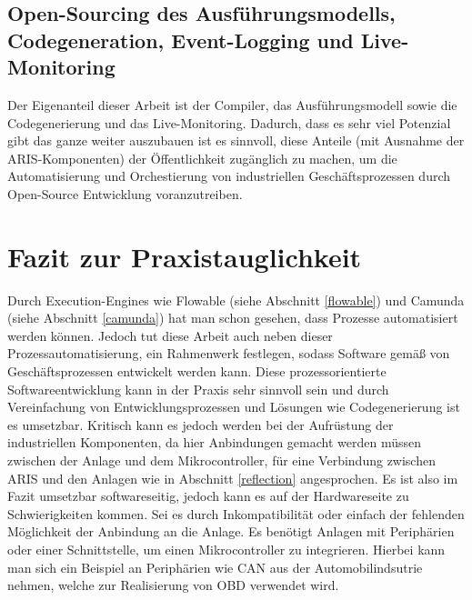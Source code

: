 \subsection{Open-Sourcing des Ausführungsmodells, Codegeneration, Event-Logging und Live-Monitoring}

Der Eigenanteil dieser Arbeit ist der Compiler, das Ausführungsmodell sowie die Codegenerierung und das Live-Monitoring. Dadurch, dass es sehr viel Potenzial gibt das ganze weiter 
auszubauen ist es sinnvoll, diese Anteile (mit Ausnahme der ARIS-Komponenten) der Öffentlichkeit zugänglich zu machen, um die Automatisierung und Orchestierung von industriellen Geschäftsprozessen 
durch Open-Source Entwicklung voranzutreiben.

\section{Fazit zur Praxistauglichkeit}

Durch Execution-Engines wie Flowable (siehe Abschnitt \ref{flowable}) und Camunda (siehe Abschnitt \ref{camunda}) hat man schon gesehen, dass Prozesse automatisiert werden können. Jedoch tut diese Arbeit auch neben dieser Prozessautomatisierung, ein Rahmenwerk festlegen, 
sodass Software gemäß von Geschäftsprozessen entwickelt werden kann. Diese prozessorientierte Softwareentwicklung kann in der Praxis sehr sinnvoll sein und durch Vereinfachung von Entwicklungsprozessen und 
Lösungen wie Codegenerierung ist es umsetzbar. Kritisch kann es jedoch werden bei der Aufrüstung der industriellen Komponenten, da hier Anbindungen gemacht werden müssen zwischen der Anlage und dem Mikrocontroller, 
für eine Verbindung zwischen ARIS und den Anlagen wie in Abschnitt \ref{reflection} angesprochen. Es ist also im Fazit umsetzbar softwareseitig, jedoch kann es auf der Hardwareseite zu Schwierigkeiten kommen. Sei es durch Inkompatibilität 
oder einfach der fehlenden Möglichkeit der Anbindung an die Anlage. Es benötigt Anlagen mit Periphärien oder einer Schnittstelle, um einen Mikrocontroller zu integrieren. Hierbei kann man sich ein Beispiel an 
Periphärien wie CAN aus der Automobilindsutrie nehmen, welche zur Realisierung von OBD verwendet wird. \cite{noauthor_road_2024} \cite{hristu-varsakelis_vehicle_2005}
